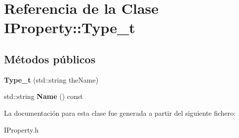 \hypertarget{classIProperty_1_1Type__t}{}\section{Referencia de la Clase I\+Property\+:\+:Type\+\_\+t}
\label{classIProperty_1_1Type__t}
\subsection*{Métodos públicos}
\begin{DoxyCompactItemize}
\item 
\hypertarget{classIProperty_1_1Type__t_a9cf5cd01fde258a89672f0ec5a0b2a71}{}{\bfseries Type\+\_\+t} (std\+::string the\+Name)\label{classIProperty_1_1Type__t_a9cf5cd01fde258a89672f0ec5a0b2a71}

\item 
\hypertarget{classIProperty_1_1Type__t_ad7ab65f192478f0487c5194e739f906c}{}std\+::string {\bfseries Name} () const \label{classIProperty_1_1Type__t_ad7ab65f192478f0487c5194e739f906c}

\end{DoxyCompactItemize}


La documentación para esta clase fue generada a partir del siguiente fichero\+:\begin{DoxyCompactItemize}
\item 
I\+Property.\+h\end{DoxyCompactItemize}
